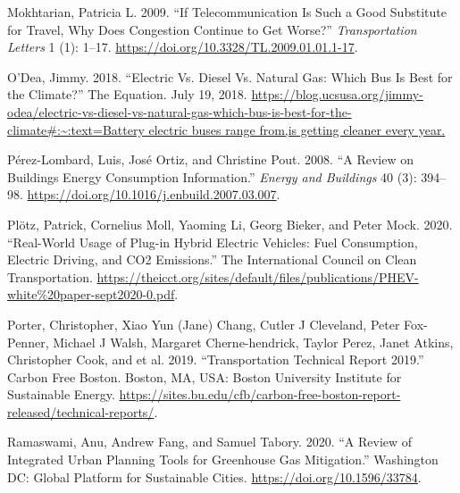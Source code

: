 \documentclass[
]{book}
\newlength{\cslhangindent}
\newlength{\cslentryspacingunit} %
\newenvironment{CSLReferences}[2] %
 {%
  \setlength{\parindent}{0pt}
  \ifodd #1
  \let\oldpar\par
  \def\par{\hangindent=\cslhangindent\oldpar}
  \fi
  \setlength{\parskip}{#2\cslentryspacingunit}
 }%
 {}
\begin{document}
\begin{CSLReferences}{1}{0}
\leavevmode{}%
Mokhtarian, Patricia L. 2009. {``If Telecommunication Is Such a Good Substitute for Travel, Why Does Congestion Continue to Get Worse?''} \emph{Transportation Letters} 1 (1): 1--17. \url{https://doi.org/10.3328/TL.2009.01.01.1-17}.

\leavevmode{}%
O'Dea, Jimmy. 2018. {``Electric Vs. {Diesel} Vs. {Natural Gas}: {Which Bus} Is {Best} for the {Climate}?''} {The Equation}. July 19, 2018. \href{https://blog.ucsusa.org/jimmy-odea/electric-vs-diesel-vs-natural-gas-which-bus-is-best-for-the-climate\#:~:text=Battery\%20electric\%20buses\%20range\%20from,is\%20getting\%20cleaner\%20every\%20year.}{https://blog.ucsusa.org/jimmy-odea/electric-vs-diesel-vs-natural-gas-which-bus-is-best-for-the-climate\#:\textasciitilde:text=Battery electric buses range from,is getting cleaner every year.}

\leavevmode{}%
Pérez-Lombard, Luis, José Ortiz, and Christine Pout. 2008. {``A Review on Buildings Energy Consumption Information.''} \emph{Energy and Buildings} 40 (3): 394--98. \url{https://doi.org/10.1016/j.enbuild.2007.03.007}.

\leavevmode{}%
Plötz, Patrick, Cornelius Moll, Yaoming Li, Georg Bieker, and Peter Mock. 2020. {``Real-World Usage of Plug-in Hybrid Electric Vehicles: {Fuel} Consumption, Electric Driving, and {CO2} Emissions.''} {The International Council on Clean Transportation}. \url{https://theicct.org/sites/default/files/publications/PHEV-white\%20paper-sept2020-0.pdf}.

\leavevmode{}%
Porter, Christopher, Xiao Yun (Jane) Chang, Cutler J Cleveland, Peter Fox-Penner, Michael J Walsh, Margaret Cherne-hendrick, Taylor Perez, Janet Atkins, Christopher Cook, and et al. 2019. {``Transportation {Technical Report} 2019.''} Carbon {Free Boston}. {Boston, MA, USA}: {Boston University Institute for Sustainable Energy}. \url{https://sites.bu.edu/cfb/carbon-free-boston-report-released/technical-reports/}.

\leavevmode{}%
Ramaswami, Anu, Andrew Fang, and Samuel Tabory. 2020. {``A {Review} of {Integrated Urban Planning Tools} for {Greenhouse Gas Mitigation}.''} {Washington DC}: {Global Platform for Sustainable Cities}. \url{https://doi.org/10.1596/33784}.


\end{CSLReferences}
\end{document}
